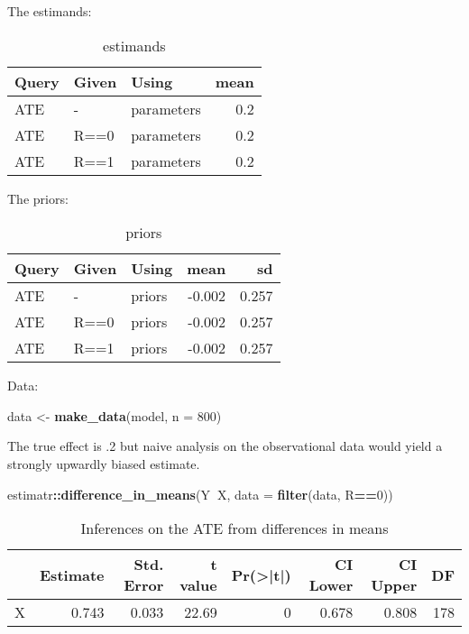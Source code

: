 \documentclass[
  12pt,
]{book}
\newenvironment{Shaded}{\begin{snugshade}}{\end{snugshade}}
\newcommand{\DataTypeTok}[1]{\textcolor[rgb]{0.13,0.29,0.53}{#1}}
\newcommand{\DecValTok}[1]{\textcolor[rgb]{0.00,0.00,0.81}{#1}}
\newcommand{\KeywordTok}[1]{\textcolor[rgb]{0.13,0.29,0.53}{\textbf{#1}}}
\newcommand{\NormalTok}[1]{#1}
\newcommand{\OperatorTok}[1]{\textcolor[rgb]{0.81,0.36,0.00}{\textbf{#1}}}
\newcommand{\StringTok}[1]{\textcolor[rgb]{0.31,0.60,0.02}{#1}}
\begin{document}
The estimands:

\begin{table}

\caption{\label{tab:unnamed-chunk-114}estimands}
\centering
\begin{tabular}[t]{l|l|l|r}
\hline
Query & Given & Using & mean\\
\hline
ATE & - & parameters & 0.2\\
\hline
ATE & R==0 & parameters & 0.2\\
\hline
ATE & R==1 & parameters & 0.2\\
\hline
\end{tabular}
\end{table}

The priors:

\begin{table}

\caption{\label{tab:appcombexpobs2}priors}
\centering
\begin{tabular}[t]{l|l|l|r|r}
\hline
Query & Given & Using & mean & sd\\
\hline
ATE & - & priors & -0.002 & 0.257\\
\hline
ATE & R==0 & priors & -0.002 & 0.257\\
\hline
ATE & R==1 & priors & -0.002 & 0.257\\
\hline
\end{tabular}
\end{table}

Data:

\begin{Shaded}
\begin{Highlighting}[]
\NormalTok{data <-}\StringTok{ }\KeywordTok{make_data}\NormalTok{(model, }\DataTypeTok{n =} \DecValTok{800}\NormalTok{)}
\end{Highlighting}
\end{Shaded}

The true effect is .2 but naive analysis on the observational data would yield a strongly upwardly biased estimate.

\begin{Shaded}
\begin{Highlighting}[]
\NormalTok{estimatr}\OperatorTok{::}\KeywordTok{difference_in_means}\NormalTok{(Y}\OperatorTok{~}\NormalTok{X, }\DataTypeTok{data =} \KeywordTok{filter}\NormalTok{(data, R}\OperatorTok{==}\DecValTok{0}\NormalTok{))}
\end{Highlighting}
\end{Shaded}

\begin{table}

\caption{\label{tab:unnamed-chunk-117}Inferences on the ATE from differences in means}
\centering
\begin{tabular}[t]{l|r|r|r|r|r|r|r}
\hline
  & Estimate & Std. Error & t value & Pr(>|t|) & CI Lower & CI Upper & DF\\
\hline
X & 0.743 & 0.033 & 22.69 & 0 & 0.678 & 0.808 & 178\\
\hline
\end{tabular}
\end{table}
\end{document}
